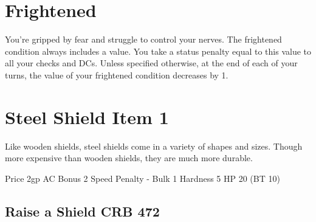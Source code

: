 \documentclass[paper=63mm:88mm, DIV=21, fontsize=7.5pt]{scrartcl}
\begin{document}
\pagestyle{empty}



\setlength\parindent{0pt} %
\setlength\parskip{4pt} %


\renewcommand*{\sectionformat}{}
\renewcommand*{\subsectionformat}{}

\newcommand{\Item}[2]{\section{#2 \hfill Item #1}}
\newcommand{\Action}[4]{\subsection[#4]{#4 \ActionSymbol{#3} \hfill {\normalfont \small #1 #2}}}

\newcommand{\Requirements}[1]{\paragraph{Requirements} #1.}
\newcommand{\WeaponDamage}[1]{\textbf{Damage} #1}
\newcommand{\ItemHands}[1]{\textbf{Hands} #1}
\newcommand{\WeaponType}[1]{\textbf{Type} #1}
\newcommand{\WeaponCategory}[1]{\textbf{Category} #1}
\newcommand{\WeaponGroup}[1]{\textbf{Group} #1}
\newcommand{\Flavor}[1]{\textit{#1}}

\newcommand{\Reference}[2]{{\small #1 #2}}


\section{Frightened}

You're gripped by fear and struggle to control your nerves.
The frightened condition always includes a value.
You take a status penalty equal to this value to all your checks and DCs.
Unless specified otherwise, at the end of each of your turns, the value of your frightened condition decreases by 1.

\Item{1}{Steel Shield}

Like wooden shields, steel shields come in a variety of shapes and sizes. Though more expensive than wooden shields, they are much more durable.

Price 2gp
AC Bonus 2
Speed Penalty -
Bulk 1
Hardness 5
HP 20 (BT 10)

\Action{CRB}{472}{1}{Raise a Shield}
\end{document}
